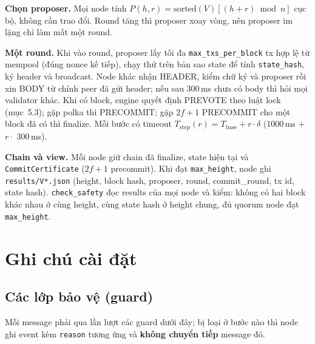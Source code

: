 \documentclass[11pt,a4paper]{article}
\newcommand{\code}[1]{\texttt{#1}}
\begin{document}
\textbf{Chọn proposer.} Mọi node tính $P(h,r) = \mathrm{sorted}(V)[(h + r) \bmod n]$ cục bộ, không cần trao đổi. Round tăng thì proposer xoay vòng, nên proposer im lặng chỉ làm mất một round.

\textbf{Một round.} Khi vào round, proposer lấy tối đa \code{max\_txs\_per\_block} tx hợp lệ từ mempool (đúng nonce kế tiếp), chạy thử trên bản sao state để tính \code{state\_hash}, ký header và broadcast. Node khác nhận HEADER, kiểm chữ ký và proposer rồi xin BODY từ chính peer đã gửi header; nếu sau 300\,ms chưa có body thì hỏi mọi validator khác. Khi có block, engine quyết định PREVOTE theo luật lock (mục~5.3); gặp polka thì PRECOMMIT; gặp $2f+1$ PRECOMMIT cho một block đã có thì finalize. Mỗi bước có timeout $T_{\text{step}}(r) = T_{\text{base}} + r \cdot \delta$ (1000\,ms + $r \cdot$ 300\,ms).

\textbf{Chain và view.} Mỗi node giữ chain đã finalize, state hiện tại và \code{CommitCertificate} ($2f+1$ precommit). Khi đạt \code{max\_height}, node ghi \code{results/V*.json} (height, block hash, proposer, round, commit\_round, tx id, state hash). \code{check\_safety} đọc results của mọi node và kiểm: không có hai block khác nhau ở cùng height, cùng state hash ở height chung, đủ quorum node đạt \code{max\_height}.

\section{Ghi chú cài đặt}

\subsection{Các lớp bảo vệ (guard)}
Mỗi message phải qua lần lượt các guard dưới đây; bị loại ở bước nào thì node ghi event kèm \code{reason} tương ứng và \textbf{không chuyển tiếp} message đó.
\end{document}
